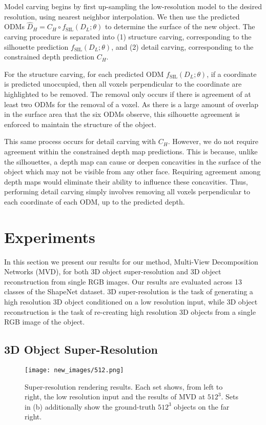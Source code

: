 \documentclass{article}
\begin{document}
Model carving begins by first up-sampling the low-resolution model to the desired resolution, using nearest neighbor interpolation. We then use the predicted ODMs $\hat D_H = C_H \circ f_{\text{SIL}}(D_L; \theta)$ to determine the surface of the new object. The carving procedure is separated into (1) structure carving, corresponding to the silhouette prediction $f_{\text{SIL}}(D_L; \theta)$, and (2) detail carving, corresponding to the constrained depth prediction $C_H$. 

For the structure carving, for each predicted ODM $f_{\text{SIL}}(D_L; \theta)$, if a coordinate is predicted unoccupied, then all voxels perpendicular to the coordinate are highlighted to be removed. The removal only occurs if there is agreement of at least two ODMs for the removal of a voxel. As there is a large amount of overlap in the surface area that the six ODMs observe, this silhouette agreement is enforced to maintain the structure of the object. 

This same process occurs for detail carving with $C_H$. However, we do not require agreement within the constrained depth map predictions. This is because, unlike the silhouettes, a depth map can cause or deepen concavities in the surface of the object which may not be visible from any other face. Requiring agreement among depth maps would eliminate their ability to influence these concavities. Thus, performing detail carving simply involves removing all voxels perpendicular to each coordinate of each ODM, up to the predicted depth. 

\section{Experiments}
In this section we present our results for our method, Multi-View Decomposition Networks (MVD), for both 3D object super-resolution and 3D object reconstruction from single RGB images. 
Our results are evaluated across 13 classes of the ShapeNet \cite{ShapeNet} dataset. 3D super-resolution is the task of generating a high resolution 3D object conditioned on a low resolution input, while 3D object reconstruction is the task of re-creating high resolution 3D objects from a single RGB image of the object. 

\subsection{3D Object Super-Resolution} \label{sec:exp:3DSR}

\begin{figure*} 
\texttt{[image: new\_images/512.png]}
\centering
\subfloat[]{\hspace{0.6\linewidth}}
\subfloat[]{\hspace{0.4\linewidth}}
\caption{Super-resolution rendering results. Each set shows, from left to right, the low resolution input and the results of MVD at $512^3$. Sets in (b) additionally show the ground-truth $512^3$ objects on the far right.} \label{fig:SR_results_512} 
\end{figure*}
\end{document}
